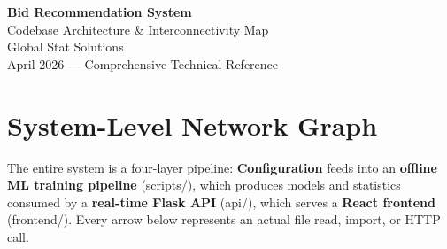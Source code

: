 \documentclass[11pt,a4paper]{article}
\begin{document}
\begin{center}
    {\LARGE\bfseries\color{gssblue} Bid Recommendation System}\\[0.3em]
    {\Large Codebase Architecture \& Interconnectivity Map}\\[1em]
    {\large Global Stat Solutions}\\[0.3em]
    {\small April 2026 --- Comprehensive Technical Reference}
\end{center}

\vspace{0.5em}

\tableofcontents
\newpage

\section{System-Level Network Graph}

The entire system is a four-layer pipeline: \textbf{Configuration} feeds into an
\textbf{offline ML training pipeline} (scripts/), which produces models and statistics
consumed by a \textbf{real-time Flask API} (api/), which serves a \textbf{React
frontend} (frontend/). Every arrow below represents an actual file read, import, or
HTTP call.
\end{document}
